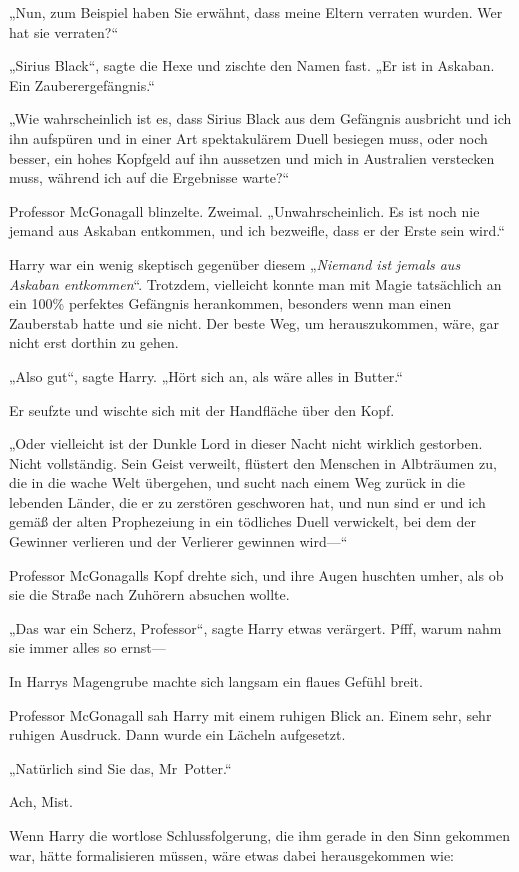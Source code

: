 {„Nun, zum Beispiel haben Sie erwähnt, dass meine Eltern verraten wurden. Wer hat sie verraten?“

„Sirius Black“, sagte die Hexe und zischte den Namen fast. „Er ist in Askaban. Ein Zauberergefängnis.“

„Wie wahrscheinlich ist es, dass Sirius Black aus dem Gefängnis ausbricht und ich ihn aufspüren und in einer Art spektakulärem Duell besiegen muss, oder noch besser, ein hohes Kopfgeld auf ihn aussetzen und mich in Australien verstecken muss, während ich auf die Ergebnisse warte?“

Professor McGonagall blinzelte. Zweimal. „Unwahrscheinlich. Es ist noch nie jemand aus Askaban entkommen, und ich bezweifle, dass er der Erste sein wird.“

Harry war ein wenig skeptisch gegenüber diesem „\emph{Niemand ist jemals aus Askaban entkommen}“. Trotzdem, vielleicht konnte man mit Magie tatsächlich an ein 100\% perfektes Gefängnis herankommen, besonders wenn man einen Zauberstab hatte und sie nicht. Der beste Weg, um herauszukommen, wäre, gar nicht erst dorthin zu gehen.

„Also gut“, sagte Harry. „Hört sich an, als wäre alles in Butter.“

Er seufzte und wischte sich mit der Handfläche über den Kopf.

„Oder vielleicht ist der Dunkle Lord in dieser Nacht nicht wirklich gestorben. Nicht vollständig. Sein Geist verweilt, flüstert den Menschen in Albträumen zu, die in die wache Welt übergehen, und sucht nach einem Weg zurück in die lebenden Länder, die er zu zerstören geschworen hat, und nun sind er und ich gemäß der alten Prophezeiung in ein tödliches Duell verwickelt, bei dem der Gewinner verlieren und der Verlierer gewinnen wird—“

Professor McGonagalls Kopf drehte sich, und ihre Augen huschten umher, als ob sie die Straße nach Zuhörern absuchen wollte.

„Das war ein Scherz, Professor“, sagte Harry etwas verärgert. Pfff, warum nahm sie immer alles so ernst—

In Harrys Magengrube machte sich langsam ein flaues Gefühl breit.

Professor McGonagall sah Harry mit einem ruhigen Blick an. Einem sehr, sehr ruhigen Ausdruck. Dann wurde ein Lächeln aufgesetzt.

„Natürlich sind Sie das, Mr~Potter.“

Ach, Mist.

Wenn Harry die wortlose Schlussfolgerung, die ihm gerade in den Sinn gekommen war, hätte formalisieren müssen, wäre etwas dabei herausgekommen wie:

}

